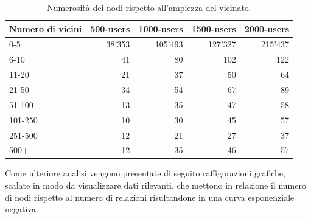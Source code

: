     \begin{table}[H]
        \centering
        \begin{tabular}{l|r|r|r|r}
            \textbf{Numero di vicini} & \textbf{500-users} & \textbf{1000-users} & \textbf{1500-users} & \textbf{2000-users} \\ 
            \hline
            0-5                       & 38'353                   & 105'493                  & 127'327                   & 215'437                   \\
            6-10                      & 41                       & 80                       & 102                       & 122                       \\
            11-20                     & 21                       & 37                       & 50                        & 64                        \\
            21-50                     & 34                       & 54                       & 67                        & 89                        \\
            51-100                    & 13                       & 35                       & 47                        & 58                        \\
            101-250                   & 10                       & 30                       & 45                        & 57                        \\
            251-500                   & 12                       & 21                       & 27                        & 37                        \\
            500+                      & 12                       & 35                       & 46                        & 57                       
        \end{tabular}
        \caption{Numerosità dei nodi rispetto all'ampiezza del vicinato.}
        \label{tab:neighbors}
    \end{table}
    
    Come ulteriore analisi vengono presentate di seguito raffigurazioni grafiche, scalate in modo da visualizzare dati rilevanti, che mettono in relazione il numero di nodi rispetto al numero di relazioni risultandone in una curva esponenziale negativa.
    
